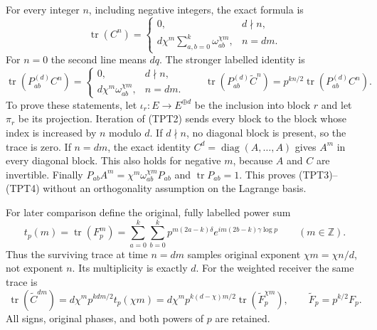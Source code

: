 For every integer $n$, including negative integers, the exact formula is
\begin{equation}\tag{TPT3}
 \operatorname{tr}(C^n)=
 \begin{cases}
 0,&d\nmid n,\\
 d\chi^m\displaystyle\sum_{a,b=0}^k\omega_{ab}^{\chi m},&n=dm.
 \end{cases}
\end{equation}
For $n=0$ the second line means $dq$. The stronger labelled identity is
\begin{equation}\tag{TPT4}
 \operatorname{tr}(P_{ab}^{(d)}C^n)=
 \begin{cases}0,&d\nmid n,\\d\chi^m\omega_{ab}^{\chi m},&n=dm.
 \end{cases}
 \qquad
 \operatorname{tr}(P_{ab}^{(d)}\widetilde C^n)
   =p^{kn/2}\operatorname{tr}(P_{ab}^{(d)}C^n).
\end{equation}
To prove these statements, let $\iota_r:E\to E^{\oplus d}$ be the
inclusion into block $r$ and let $\pi_r$ be its projection. Iteration
of (TPT2) sends every block to the block whose index is increased by
$n$ modulo $d$. If $d\nmid n$, no diagonal block is present, so the
trace is zero. If $n=dm$, the exact identity
$C^d=\operatorname{diag}(A,\ldots,A)$ gives $A^m$ in every diagonal
block. This also holds for negative $m$, because $A$ and $C$ are
invertible. Finally $P_{ab}A^m=\chi^m\omega_{ab}^{\chi m}P_{ab}$
and $\operatorname{tr}P_{ab}=1$. This proves (TPT3)--(TPT4) without
an orthogonality assumption on the Lagrange basis.

For later comparison define the original, fully labelled power sum
\begin{equation}\tag{TPT5}
 t_p(m)=\operatorname{tr}(F_p^m)
   =\sum_{a=0}^k\sum_{b=0}^k
       p^{m(2a-k)\delta}e^{im(2b-k)\gamma\log p}
       \qquad(m\in\mathbb Z).
\end{equation}
Thus the surviving trace at time $n=dm$ samples original exponent
$\chi m=\chi n/d$, not exponent $n$. Its multiplicity is exactly $d$.
For the weighted receiver the same trace is
\begin{equation}\tag{TPT6}
 \operatorname{tr}(\widetilde C^{dm})
       =d\chi^m p^{kdm/2}t_p(\chi m)
       =d\chi^m p^{k(d-\chi)m/2}
                         \operatorname{tr}(\widetilde F_p^{\chi m}),
 \qquad \widetilde F_p=p^{k/2}F_p.
\end{equation}
All signs, original phases, and both powers of $p$ are retained.

